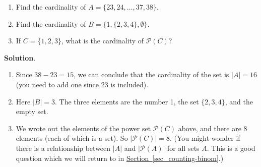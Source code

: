 \documentclass[11pt,]{book}
\theoremstyle{ptxplainnotitle}
\theoremstyle{ptxplaintitle}
\theoremstyle{ptxdefinitionnotitle}
\theoremstyle{ptxdefinitiontitle}
\theoremstyle{ptxdefinitionnotitle}
\theoremstyle{ptxdefinitiontitle}
\theoremstyle{ptxdefinitionnotitle}
\theoremstyle{ptxdefinitiontitle}
\theoremstyle{ptxdefinitiontitlenonumber}
\theoremstyle{ptxdefinitiontitlenonumber}
\numberwithin{equation}{chapter}
\newcommand{\pow}{\mathcal P}
\newcommand{\card}[1]{\left| #1 \right|}
\begin{document}
\begin{example}\label{example-31}
\hypertarget{p-772}{}%
\leavevmode%
\begin{enumerate}
\item\hypertarget{li-313}{}\hypertarget{p-773}{}%
Find the cardinality of \(A = \{23, 24, \ldots, 37, 38\}\).%
\item\hypertarget{li-314}{}\hypertarget{p-774}{}%
Find the cardinality of \(B = \{1, \{2, 3, 4\}, \emptyset\}\).%
\item\hypertarget{li-315}{}\hypertarget{p-775}{}%
If \(C = \{1,2,3\}\), what is the cardinality of \(\pow(C)\)?%
\end{enumerate}
%
\par\smallskip%
\noindent\textbf{Solution}.\hypertarget{solution-103}{}\quad%
\hypertarget{p-776}{}%
\leavevmode%
\begin{enumerate}
\item\hypertarget{li-316}{}\hypertarget{p-777}{}%
Since \(38 - 23 = 15\), we can conclude that the cardinality of the set is \(|A| = 16\) (you need to add one since 23 is included).%
\item\hypertarget{li-317}{}\hypertarget{p-778}{}%
Here \(|B| = 3\). The three elements are the number 1, the set \(\{2,3,4\}\), and the empty set.%
\item\hypertarget{li-318}{}\hypertarget{p-779}{}%
We wrote out the elements of the power set \(\pow(C)\) above, and there are 8 elements (each of which is a set). So \(\card{\pow(C)} = 8\).  (You might wonder if there is a relationship between \(\card{A}\) and \(\card{\pow(A)}\) for all sets \(A\).  This is a good question which we will return to in \hyperref[sec_counting-binom]{Section~\ref{sec_counting-binom}}.)%
\end{enumerate}
%
\end{example}
\typeout{************************************************}
\typeout{************************************************}
\end{document}
